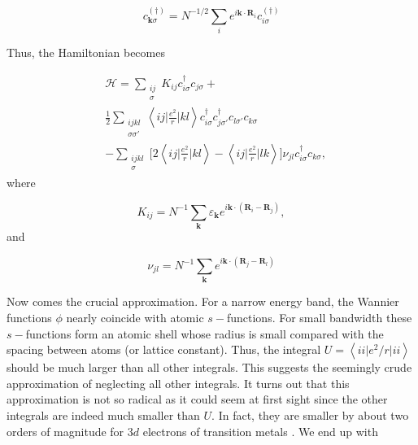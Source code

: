 \begin{equation}
c_{\bm k \sigma}^{(\dagger)} = N^{-1/2} \sum_i e^{i \bm k \cdot \bm R_i} c_{i\sigma}^{(\dagger)}
\end{equation}

Thus, the Hamiltonian becomes 

\begin{equation}
\begin{split}
&\mathcal{H} = \sum_{\substack{ i j \\ \sigma} } K_{ij} c_{i \sigma}^\dagger c_{j \sigma} + \\
&\frac{1}{2} \sum_{\substack{i j k l \\ \sigma \sigma'} }\left\langle i j \bigg| \frac{e^2}{r} \bigg| k l \right\rangle 
 c_{i \sigma}^\dagger c_{j \sigma'}^\dagger c_{l \sigma'} c_{ k \sigma} \\
 &- \sum_{\substack{ijkl \\ \sigma }} \bigg[ 2 \left\langle i j \bigg| \frac{e^2}{r} \bigg| k l \right\rangle - \left\langle i j \bigg| \frac{e^2}{r} \bigg| l k \right\rangle \bigg] \nu_{j l} c_{i \sigma}^\dagger c_{ k \sigma} ,
\end{split}
\end{equation}
where

\begin{equation}\label{eq:hopping_matrix}
K_{ij} = N^{-1} \sum_{\bm k} \varepsilon_{\bm k} e^{i \bm k \cdot ( \bm R_i - \bm R_j )},
\end{equation}
and

\begin{equation}
\nu_{j l} = N^{-1} \sum_{\bm k} e^{i \bm k \cdot ( \bm R_j - \bm R_l) }
\end{equation}

Now comes the crucial approximation. For a narrow energy band, the Wannier functions $\phi$ nearly coincide with atomic $s-$functions. For small bandwidth these $s-$functions form an atomic shell whose radius is small compared with the spacing between atoms (or lattice constant). Thus, the integral $U = \left\langle i i \big| e^2 / r \big| i i \right\rangle$ should be much larger than all other integrals. This suggests the seemingly crude approximation of neglecting all other integrals. It turns out that this approximation is not so radical as it could seem at first sight since the other integrals are indeed much smaller than $U$. In fact, they are smaller by about two orders of magnitude for $3d$ electrons of transition metals \cite{Hubbard1963}. We end up with

